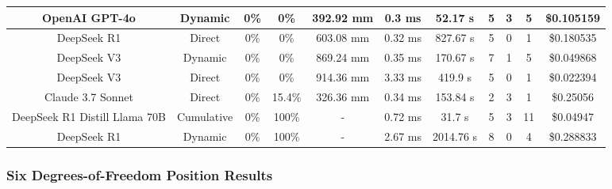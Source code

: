 \begin{landscape}
\begin{table}[H]
\begin{center}
\begin{tabular}{|c|c|c|c|c|c|c|c|c|c|c|}
    OpenAI GPT-4o & Dynamic & 0\% & 0\% & 392.92 mm & 0.3 ms & 52.17 s & 5 & 3 & 5 & \$0.105159 \\
    \hline
    DeepSeek R1 & Direct & 0\% & 0\% & 603.08 mm & 0.32 ms & 827.67 s & 5 & 0 & 1 & \$0.180535 \\
    \hline
    DeepSeek V3 & Dynamic & 0\% & 0\% & 869.24 mm & 0.35 ms & 170.67 s & 7 & 1 & 5 & \$0.049868 \\
    \hline
    DeepSeek V3 & Direct & 0\% & 0\% & 914.36 mm & 3.33 ms & 419.9 s & 5 & 0 & 1 & \$0.022394 \\
    \hline
    Claude 3.7 Sonnet & Direct & 0\% & 15.4\% & 326.36 mm & 0.34 ms & 153.84 s & 2 & 3 & 1 & \$0.25056 \\
    \hline
    DeepSeek R1 Distill Llama 70B & Cumulative & 0\% & 100\% & - & 0.72 ms & 31.7 s & 5 & 3 & 11 & \$0.04947 \\
    \hline
    DeepSeek R1 & Dynamic & 0\% & 100\% & - & 2.67 ms & 2014.76 s & 8 & 0 & 4 & \$0.288833 \\
    \hline
\end{tabular}
\label{Results-Position-2-6}
\end{center}
\end{table}

\subsubsection{Six Degrees-of-Freedom Position Results}


\end{landscape}
